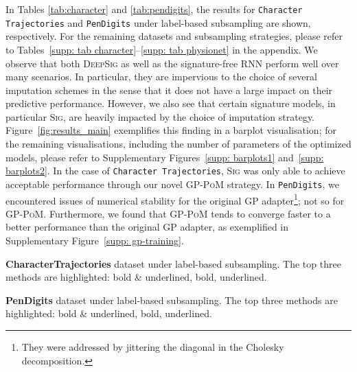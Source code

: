 \documentclass{article}
\begin{document}
In Tables \ref{tab:character} and \ref{tab:pendigits}, the results for
\texttt{Character Trajectories} and \texttt{PenDigits} under label-based
subsampling are shown, respectively. For the remaining datasets and
subsampling strategies, please refer to Tables~\ref{supp: tab
character}--\ref{supp: tab physionet} in the appendix. 
%
%
We observe that both \textsc{DeepSig} as well as the signature-free \textsc{RNN} perform well
over many scenarios. In particular, they are impervious to the choice of
several imputation schemes in the sense that it does not have a large
impact on their predictive performance.
%
However, we also see that certain signature models, in particular
\textsc{Sig}, are heavily impacted by the choice of imputation strategy.
Figure~\ref{fig:results_main} exemplifies this finding in a barplot
visualisation; for the remaining visualisations, including the number of
parameters of the optimized models, please refer to Supplementary
Figures~\ref{supp: barplots1} and~\ref{supp: barplots2}. In the case of
\texttt{Character Trajectories}, \textsc{Sig} was only able to achieve
acceptable performance through our novel \textsc{GP-PoM} strategy. In
\texttt{PenDigits}, we encountered issues of numerical stability for the
original GP adapter\footnote{They were addressed by jittering the
diagonal in the Cholesky decomposition.}; not so for \textsc{GP-PoM}.
Furthermore, we found that \textsc{GP-PoM} tends to converge faster to
a better performance than the original GP adapter, as exemplified in
Supplementary Figure~\ref{supp: gp-training}.

\begin{table}[t]
    \caption{\textbf{CharacterTrajectories} dataset under label-based subsampling. The top three methods are highlighted: bold \& underlined, bold, underlined.}
    \centering
    
    \label{tab:character}
\end{table}

\begin{table}[h]
    \caption{\textbf{PenDigits} dataset under label-based subsampling. The top three methods are highlighted: bold \& underlined, bold, underlined.}
    \centering
    
    \label{tab:pendigits}
\end{table}
\end{document}
